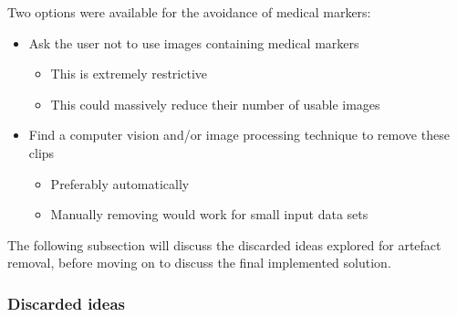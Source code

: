 Two options were available for the avoidance of medical markers:
\begin{itemize}
  \item Ask the user not to use images containing medical markers
  \begin{itemize}
    \item This is extremely restrictive
    \item This could massively reduce their number of usable images
  \end{itemize}
  \item Find a computer vision and/or image processing technique to remove these clips
  \begin{itemize}
    \item Preferably automatically
    \item Manually removing would work for small input data sets
  \end{itemize}
\end{itemize}

The following subsection will discuss the discarded ideas explored for artefact removal, before moving on to discuss the final implemented solution.

\subsubsection{Discarded ideas}

